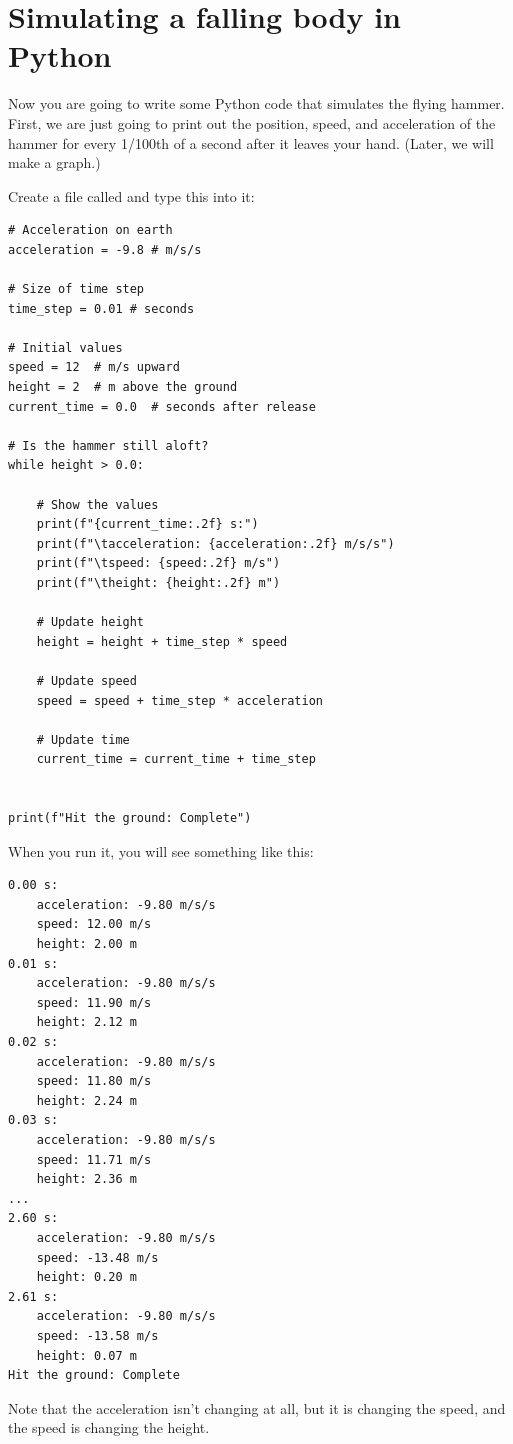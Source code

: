 \section{Simulating a falling body in Python}

Now you are going to write some Python code that simulates the flying hammer. First, we are just going to print out the position, speed, and acceleration of the hammer for every 1/100th of a second after it leaves your hand. (Later, we will make a graph.)

Create a file called  and type this into it:

\begin{Verbatim}
# Acceleration on earth
acceleration = -9.8 # m/s/s

# Size of time step
time_step = 0.01 # seconds

# Initial values
speed = 12  # m/s upward
height = 2  # m above the ground
current_time = 0.0  # seconds after release

# Is the hammer still aloft?
while height > 0.0:

    # Show the values
    print(f"{current_time:.2f} s:")
    print(f"\tacceleration: {acceleration:.2f} m/s/s")
    print(f"\tspeed: {speed:.2f} m/s")
    print(f"\theight: {height:.2f} m")

    # Update height
    height = height + time_step * speed

    # Update speed
    speed = speed + time_step * acceleration

    # Update time
    current_time = current_time + time_step


print(f"Hit the ground: Complete")
\end{Verbatim}

When you run it, you will see something like this:
\begin{Verbatim}
0.00 s:
	acceleration: -9.80 m/s/s
	speed: 12.00 m/s
	height: 2.00 m
0.01 s:
	acceleration: -9.80 m/s/s
	speed: 11.90 m/s
	height: 2.12 m
0.02 s:
	acceleration: -9.80 m/s/s
	speed: 11.80 m/s
	height: 2.24 m
0.03 s:
	acceleration: -9.80 m/s/s
	speed: 11.71 m/s
	height: 2.36 m
...
2.60 s:
	acceleration: -9.80 m/s/s
	speed: -13.48 m/s
	height: 0.20 m
2.61 s:
	acceleration: -9.80 m/s/s
	speed: -13.58 m/s
	height: 0.07 m
Hit the ground: Complete
\end{Verbatim}

Note that the acceleration isn't changing at all, but it is changing
the speed, and the speed is changing the height.

